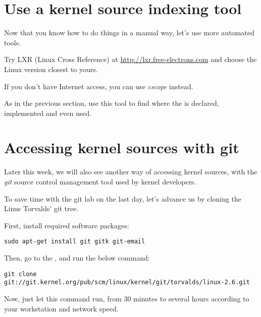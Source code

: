 \section{Use a kernel source indexing tool}

Now that you know how to do things in a manual way, let's use more
automated tools.

Try LXR (Linux Cross Reference) at \url{http://lxr.free-electrons.com}
and choose the Linux version closest to yours.

If you don't have Internet access, you can use {\em cscope} instead.

As in the previous section, use this tool to find where
the  is declared, implemented and
even used.

\section{Accessing kernel sources with git}

Later this week, we will also see another way of accessing kernel
sources, with the {\em git} source control management tool used by kernel
developers.

To save time with the git lab on the last day, let's advance us by
cloning the Linus Torvalds' git tree.

First, install required software packages:

\begin{verbatim}
sudo apt-get install git gitk git-email
\end{verbatim}

Then, go to the , and run
the below command:

\small
\begin{verbatim}
git clone git://git.kernel.org/pub/scm/linux/kernel/git/torvalds/linux-2.6.git
\end{verbatim}
\normalsize

Now, just let this command run, from 30 minutes to several hours
according to your workstation and network speed.

